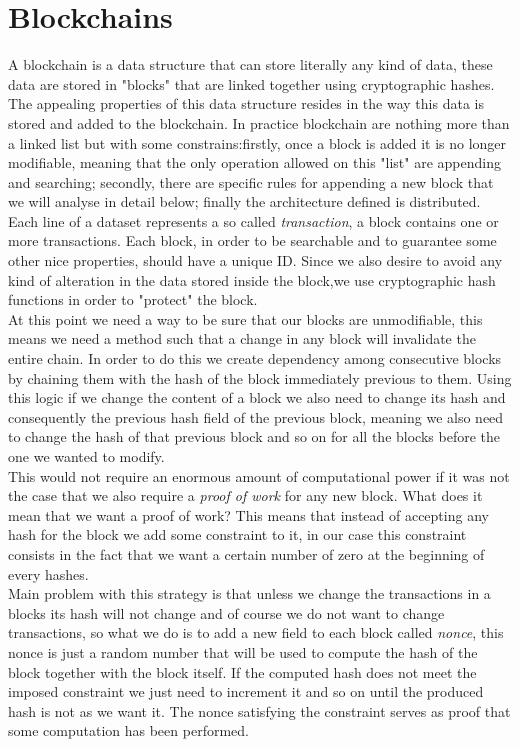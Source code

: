 \documentclass[12pt]{article}
\begin{document}
\section{Blockchains}
A blockchain is a data structure that can store literally any kind of data, these data are stored in "blocks" that are linked together using cryptographic hashes.\\
The appealing properties of this data structure resides in the way this data is stored and added to the blockchain. In practice blockchain are nothing more than a linked list but with some constrains:firstly, once a block is added it is no longer modifiable, meaning that the only operation allowed on this "list" are appending and searching; secondly, there are specific rules for appending a new block that we will analyse in detail below; finally the architecture defined is distributed.\\

Each line of a dataset represents a so called \textit{transaction}, a block contains one or more transactions.  Each block, in order to be searchable and to guarantee some other nice properties, should have a unique ID. Since we also desire to avoid any kind of alteration in the data stored inside the block,we use cryptographic hash functions in order to "protect" the block.\\

At this point we need a way to be sure that our blocks are unmodifiable, this means we need a method such that a change in any block will invalidate the entire chain. In order to do this we create dependency among consecutive blocks by chaining them with the hash of the block immediately previous to them. Using this logic if we change the content of a block we also need to change its hash and consequently the previous hash field of the previous block, meaning we also need to change the hash of that previous block and so on for all the blocks before the one we wanted to modify.\\

This would not require an enormous amount of computational power if it was not the case that we also require a \textit{proof of work} for any new block. What does it mean that we want a proof of work? This means that instead of accepting any hash for the block we add some constraint to it, in our case this constraint consists in the fact that we want a certain number of zero at the beginning of every hashes.\\
Main problem with this strategy is that unless we change the transactions in a blocks its hash will not change and of course we do not want to change transactions, so what we do is to add a new field to each block called \textit{nonce}, this nonce is just a random number that will be used to compute the hash of the block together with the block itself. If the computed hash does not meet the imposed constraint we just need to increment it and so on until the produced hash is not as we want it. The nonce satisfying the constraint serves as proof that some computation has been performed.\\ 
\end{document}
